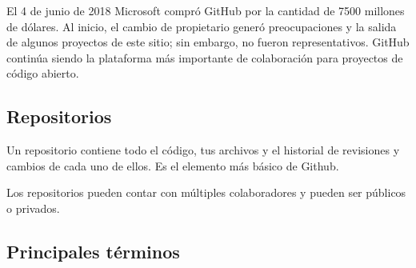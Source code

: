 \documentclass[
  letterpaper,
  DIV=11,
  numbers=noendperiod]{scrartcl}
\begin{document}
\begin{tcolorbox}[enhanced jigsaw, opacitybacktitle=0.6, colback=white, titlerule=0mm, breakable, toprule=.15mm, colbacktitle=quarto-callout-note-color!10!white, bottomtitle=1mm, left=2mm, leftrule=.75mm, opacityback=0, colframe=quarto-callout-note-color-frame, rightrule=.15mm, title=\textcolor{quarto-callout-note-color}{\faInfo}\hspace{0.5em}{Note}, toptitle=1mm, coltitle=black, arc=.35mm, bottomrule=.15mm]

El 4 de junio de 2018 Microsoft compró GitHub por la cantidad de 7500
millones de dólares. Al inicio, el cambio de propietario generó
preocupaciones y la salida de algunos proyectos de este sitio; sin
embargo, no fueron representativos. GitHub continúa siendo la plataforma
más importante de colaboración para proyectos de código abierto.

\end{tcolorbox}

\subsection{Repositorios}\label{repositorios}

Un repositorio contiene todo el código, tus archivos y el historial de
revisiones y cambios de cada uno de ellos. Es el elemento más básico de
Github.

Los repositorios pueden contar con múltiples colaboradores y pueden ser
públicos o privados.

\subsection{Principales términos}\label{principales-tuxe9rminos}
\end{document}
